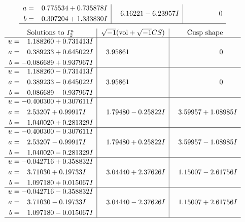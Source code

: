 \documentclass[1p]{elsarticle_modified}
\theoremstyle{definition}
\newcommand{\I}{\sqrt{-1}}
\begin{document}
$$\begin{array}{c|c|c}
\begin{aligned}
a &= \phantom{-}0.775534 + 0.735878 I \\
b &= \phantom{-}0.307204 + 1.333830 I\end{aligned}
 & \phantom{-}6.16221 - 6.23957 I & \phantom{-0.000000 } 0\\
 \hline 
 \end{array}$$\newpage$$\begin{array}{c|c|c}  
\text{Solutions to }I^u_{2}& \I (\text{vol} + \sqrt{-1}CS) & \text{Cusp shape}\\
 \hline 
\begin{aligned}
u &= \phantom{-}1.188260 + 0.731413 I \\
a &= \phantom{-}0.389233 + 0.645022 I \\
b &= -0.086689 + 0.937967 I\end{aligned}
 & \phantom{-}3.95861\phantom{ +0.000000I} & \phantom{-0.000000 } 0 \\ \hline\begin{aligned}
u &= \phantom{-}1.188260 - 0.731413 I \\
a &= \phantom{-}0.389233 - 0.645022 I \\
b &= -0.086689 - 0.937967 I\end{aligned}
 & \phantom{-}3.95861\phantom{ +0.000000I} & \phantom{-0.000000 } 0 \\ \hline\begin{aligned}
u &= -0.400300 + 0.307611 I \\
a &= \phantom{-}2.53207 + 0.99917 I \\
b &= \phantom{-}1.040020 + 0.281329 I\end{aligned}
 & \phantom{-}1.79480 - 0.25822 I & \phantom{-}3.59957 + 1.08985 I \\ \hline\begin{aligned}
u &= -0.400300 - 0.307611 I \\
a &= \phantom{-}2.53207 - 0.99917 I \\
b &= \phantom{-}1.040020 - 0.281329 I\end{aligned}
 & \phantom{-}1.79480 + 0.25822 I & \phantom{-}3.59957 - 1.08985 I \\ \hline\begin{aligned}
u &= -0.042716 + 0.358832 I \\
a &= \phantom{-}3.71030 + 0.19733 I \\
b &= \phantom{-}1.097180 + 0.015067 I\end{aligned}
 & \phantom{-}3.04440 + 2.37626 I & \phantom{-}1.15007 - 2.61756 I \\ \hline\begin{aligned}
u &= -0.042716 - 0.358832 I \\
a &= \phantom{-}3.71030 - 0.19733 I \\
b &= \phantom{-}1.097180 - 0.015067 I\end{aligned}
 & \phantom{-}3.04440 - 2.37626 I & \phantom{-}1.15007 + 2.61756 I\\
 \hline 
 \end{array}$$\newpage\newpage\renewcommand{\arraystretch}{1}
\end{document}
